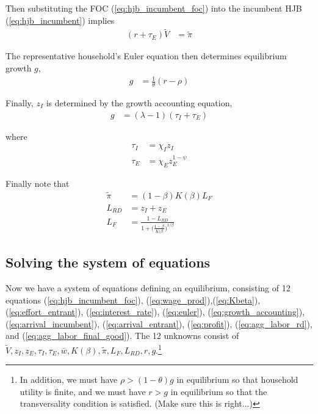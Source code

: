 \documentclass[12pt,english]{article}
\theoremstyle{remark}
\begin{document}
Then substituting the FOC (\ref{eq:hjb_incumbent_foc}) into the incumbent HJB (\ref{eq:hjb_incumbent}) implies
\begin{align}
	(r + \tau_E) \tilde{V} &= \tilde{\pi} \label{eq:interest_rate}
\end{align}

The representative household's Euler equation then determines equilibrium growth $g$, 
\begin{align}
	g &= \frac{1}{\theta} (r - \rho) \label{eq:euler}
\end{align}

Finally, $z_I$ is determined by the growth accounting equation,
\begin{align}
	g &= (\lambda - 1)(\tau_I + \tau_E) \label{eq:growth_accounting}
\end{align}

where
\begin{align}
	\tau_I &= \chi_I z_I \label{eq:arrival_incumbent}\\
	\tau_E &= \chi_E z_E^{1-\psi} \label{eq:arrival_entrant}
\end{align}

Finally note that
\begin{align}
	\tilde{\pi} &= (1-\beta)K(\beta)L_F \label{eq:profit}\\
	L_{RD} &= z_I + z_E  \label{eq:agg_labor_rd}\\
	L_F &= \frac{1-L_{RD}}{1+\big(\frac{1-\beta}{K(\beta}\big)^{1/\beta}} \label{eq:agg_labor_final_good}
\end{align}

\subsection{Solving the system of equations}

Now we have a system of equations defining an equilibrium, consisting of 12 equations (\ref{eq:hjb_incumbent_foc}), (\ref{eq:wage_prod}),(\ref{eq:Kbeta}), (\ref{eq:effort_entrant}), (\ref{eq:interest_rate}), (\ref{eq:euler}), (\ref{eq:growth_accounting}),(\ref{eq:arrival_incumbent}), (\ref{eq:arrival_entrant}), (\ref{eq:profit}), (\ref{eq:agg_labor_rd}), and (\ref{eq:agg_labor_final_good}). The 12 unknowns consist of \linebreak $\tilde{V},z_I,z_E,\tau_I,\tau_E,\bar{w},K(\beta),\tilde{\pi}, L_F, L_{RD}, r, g$.\footnote{In addition, we must have $\rho > (1-\theta)g$ in equilibrium so that household utility is finite, and we must have $r > g$ in equilibrium so that the transversality condition is satisfied. (Make sure this is right...)}
\end{document}
